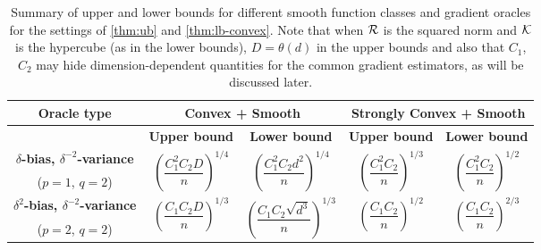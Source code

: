 \begin{table*}
\small
\centering
\label{tab:mse-1}
 \begin{tabular}{|c|c|c|c|c|}
\toprule
  \multirow{2}{*}{\textbf{Oracle type}} & \multicolumn{2}{c}{\multirow{2}{*}{\textbf{Convex + Smooth}}} & \multicolumn{2}{|c|}{\multirow{2}{*}{\textbf{Strongly Convex + Smooth}}} \\[1em]
 \midrule
 & \textbf{Upper bound} & \textbf{Lower bound} & \textbf{Upper bound} & \textbf{Lower bound}\\
 \midrule
\textbf{ $\delta$-bias, $\delta^{-2}$-variance} & \multirow{2}{*}{$\left(\dfrac{C_1^{2}C_2 D}{n}\right)^{1/4}$}  & \multirow{2}{*}{$\left(\dfrac{C_1^2 C_2 d^2}{n}\right)^{1/4}$}& \multirow{2}{*}{$\left(\dfrac{C_1^2 C_2}{n}\right)^{1/3}$}  & \multirow{2}{*}{$\left(\dfrac{C_1^2 C_2}{ n}\right)^{1/2}$} \\[0.5ex]
 ($p=1$, $q=2$) & & & &\\\midrule
\textbf{$\delta^2$-bias, $\delta^{-2}$-variance } & \multirow{2}{*}{$\left(\dfrac{C_1 C_2 D}{n}\right)^{1/3}$}  & \multirow{2}{*}{$\left(\dfrac{C_1 C_2 \sqrt{d^3}}{n}\right)^{1/3}$} & \multirow{2}{*}{$\left(\dfrac{C_1 C_2}{n}\right)^{1/2}$}  & \multirow{2}{*}{$\left(\dfrac{C_1 C_2 }{ n}\right)^{2/3}$}\\[1.4ex]
 ($p=2$, $q=2$) & & & &\\
\bottomrule
\end{tabular}
\caption{Summary of upper and lower bounds for different smooth function classes and  gradient oracles for the settings of \cref{thm:ub} and \cref{thm:lb-convex}. Note that when $\mathcal{R}$ is the squared norm and $\mathcal{K}$ is the hypercube (as in the lower bounds), $D=\theta(d)$ in the upper bounds and also that $C_1$, $C_2$ may hide dimension-dependent quantities for the common gradient estimators, as will be discussed later.}
\end{table*}


